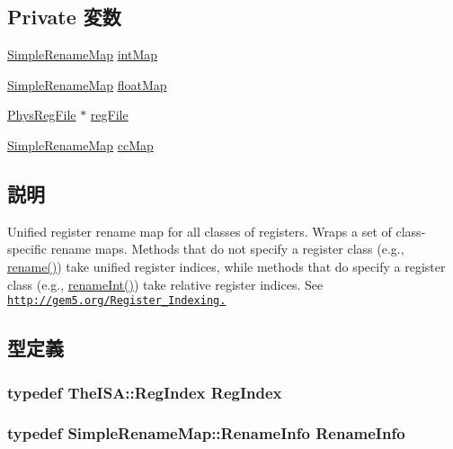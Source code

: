 \subsection*{Private 変数}
\begin{DoxyCompactItemize}
\item 
\hyperlink{classSimpleRenameMap}{SimpleRenameMap} \hyperlink{classUnifiedRenameMap_a3133c6b943f6bd39859ab4544cb8099e}{intMap}
\item 
\hyperlink{classSimpleRenameMap}{SimpleRenameMap} \hyperlink{classUnifiedRenameMap_a0850a3bd98051c123507bd1d971f5ea5}{floatMap}
\item 
\hyperlink{classPhysRegFile}{PhysRegFile} $\ast$ \hyperlink{classUnifiedRenameMap_a1cb63957414a6c5533e779b0e6e68dd7}{regFile}
\item 
\hyperlink{classSimpleRenameMap}{SimpleRenameMap} \hyperlink{classUnifiedRenameMap_a763b488cc757601419547ab2420f4fca}{ccMap}
\end{DoxyCompactItemize}


\subsection{説明}
Unified register rename map for all classes of registers. Wraps a set of class-\/specific rename maps. Methods that do not specify a register class (e.g., \hyperlink{classUnifiedRenameMap_a7942f39856cc0a6ba2479855d2a7ab53}{rename()}) take unified register indices, while methods that do specify a register class (e.g., \hyperlink{classUnifiedRenameMap_a73e9d8eeeeacc94d05a9cbd8524dc893}{renameInt()}) take relative register indices. See \href{http://gem5.org/Register_Indexing.}{\tt http://gem5.org/Register\_\-Indexing.} 

\subsection{型定義}
\hypertarget{classUnifiedRenameMap_a36d25e03e43fa3bb4c5482cbefe5e0fb}{
\subsubsection[{RegIndex}]{\setlength{\rightskip}{0pt plus 5cm}typedef TheISA::RegIndex {\bf RegIndex}}}
\label{classUnifiedRenameMap_a36d25e03e43fa3bb4c5482cbefe5e0fb}
\hypertarget{classUnifiedRenameMap_a2d31ea626004f32fc5c2aa11da776b42}{
\subsubsection[{RenameInfo}]{\setlength{\rightskip}{0pt plus 5cm}typedef {\bf SimpleRenameMap::RenameInfo} {\bf RenameInfo}}}
\label{classUnifiedRenameMap_a2d31ea626004f32fc5c2aa11da776b42}


